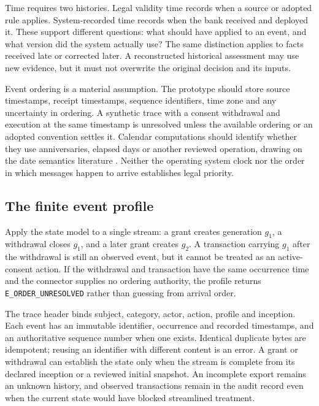 \documentclass[12pt,a4paper,oneside,openany]{book}
\begin{document}
Time requires two histories. Legal validity time records when a source or adopted
rule applies. System-recorded time records when the bank received and deployed
it. These support different questions: what should have applied to an event, and
what version did the system actually use? The same distinction applies to facts
received late or corrected later. A reconstructed historical assessment may use
new evidence, but it must not overwrite the original decision and its inputs.

Event ordering is a material assumption. The prototype should store source
timestamps, receipt timestamps, sequence identifiers, time zone and any uncertainty
in ordering. A synthetic trace with a consent withdrawal and execution at the
same timestamp is unresolved unless the available ordering or an adopted
convention settles it. Calendar computations should identify whether they use
anniversaries, elapsed days or another reviewed operation, drawing on the date
semantics literature \citep{dates2024}. Neither the operating system clock nor the
order in which messages happen to arrive establishes legal priority.

\subsection{The finite event profile}
\label{merge:P-03b-event-contract:00}


Apply the state model to a single stream: a grant creates generation $g_1$,
a withdrawal closes $g_1$, and a later grant creates $g_2$. A transaction carrying
$g_1$ after the withdrawal is still an observed event, but it cannot be treated as
an active-consent action. If the withdrawal and transaction have the same
occurrence time and the connector supplies no ordering authority, the profile
returns \texttt{E\_ORDER\_UNRESOLVED} rather than guessing from arrival order.

The trace header binds subject, category, actor, action, profile and inception.
Each event has an immutable identifier, occurrence and recorded timestamps, and
an authoritative sequence number when one exists. Identical duplicate bytes are
idempotent; reusing an identifier with different content is an error. A grant or
withdrawal can establish the state only when the stream is complete from its
declared inception or a reviewed initial snapshot. An incomplete export remains
an unknown history, and observed transactions remain in the audit record even
when the current state would have blocked streamlined treatment.
\end{document}
